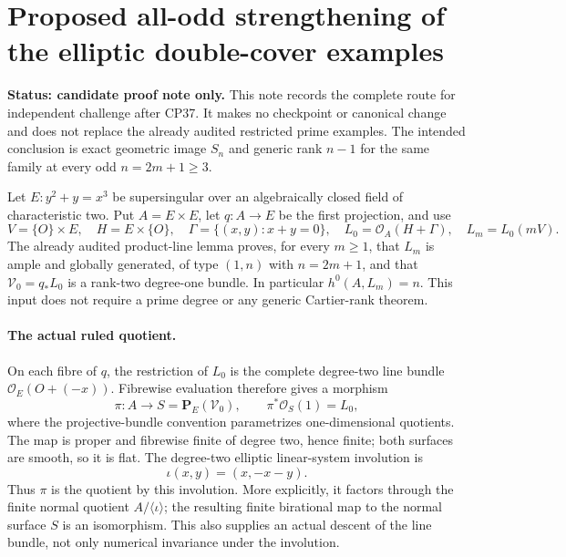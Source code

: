 \section*{Proposed all-odd strengthening of the elliptic double-cover examples}

\textbf{Status: candidate proof note only.} This note records the complete
route for independent challenge after CP37. It makes no checkpoint or
canonical change and does not replace the already audited restricted
prime examples. The intended conclusion is exact geometric image
\(S_n\) and generic rank \(n-1\) for the same family at every odd
\(n=2m+1\ge3\).

Let \(E:y^2+y=x^3\) be supersingular over an algebraically closed
field of characteristic two. Put \(A=E\times E\), let \(q:A\to E\)
be the first projection, and use
\[
 V=\{O\}\times E,\quad H=E\times\{O\},\quad
 \Gamma=\{(x,y):x+y=0\},\quad
 L_0=\mathcal O_A(H+\Gamma),\quad L_m=L_0(mV).
\]
The already audited product-line lemma proves, for every \(m\ge1\),
that \(L_m\) is ample and globally generated, of type \((1,n)\)
with \(n=2m+1\), and that
\(\mathcal V_0=q_*L_0\) is a rank-two degree-one bundle.
In particular \(h^0(A,L_m)=n\). This input does not require a
prime degree or any generic Cartier-rank theorem.

\paragraph{The actual ruled quotient.}
On each fibre of \(q\), the restriction of \(L_0\) is the complete
degree-two line bundle \(\mathcal O_E(O+(-x))\). Fibrewise evaluation
therefore gives a morphism
\[
 \pi:A\longrightarrow S=\mathbf P_E(\mathcal V_0),\qquad
 \pi^*\mathcal O_S(1)=L_0,
\]
where the projective-bundle convention parametrizes one-dimensional
quotients. The map is proper and fibrewise finite of degree two, hence
finite; both surfaces are smooth, so it is flat. The degree-two elliptic
linear-system involution is
\[
                 \iota(x,y)=(x,-x-y).
\]
Thus \(\pi\) is the quotient by this involution. More explicitly,
it factors through the finite normal quotient \(A/\langle\iota\rangle\);
the resulting finite birational map to the normal surface \(S\) is
an isomorphism. This also supplies an actual descent of the line bundle,
not only numerical invariance under the involution.


